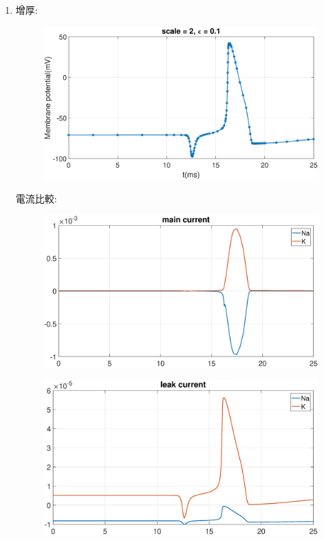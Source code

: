 \documentclass[12pt,a4paper]{article}
\begin{document}
	\begin{CJK}{UTF8}{bsmi}
		\begin{enumerate}
			\item 增厚:
			\begin{figure}[htbp]
				\centering
				\includegraphics[width = 500pt]{AP1.eps}
			\end{figure}
			\newpage
			電流比較:\\
			\begin{figure}[htbp]
				\centering
				\includegraphics[width = 500pt]{main1.eps}
			\end{figure}
			\begin{figure}[htbp]
				\centering
				\includegraphics[width = 500pt]{leak1.eps}

\end{figure}
\end{enumerate}
\end{CJK}
\end{document}

